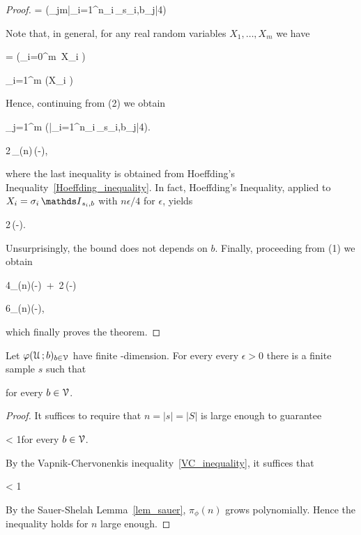 \documentclass[scombinatorics.tex]{subfiles}
\begin{document}
\begin{proof}
  {=}
  {\Pr\bigg(\max_{j\le m}\Big|\sum_{i=1}^n\sigma_i\,\Indicator_{s_i,b_j}\Big|\ge{}4\bigg)}

  Note that, in general, for any real random variables $X_1,\dots,X_m$ we have

  {=}
  {\Pr\Big(\bigcup_{i=0}^m\ X_i \ge \epsilon\Big)}

  \ceq{}
  {\le}
  {\sum_{i=1}^m \Pr\big(X_i \ge\epsilon\big)}

  Hence, continuing from (2) we obtain

  \ceq{}
  {\le}
  {\sum_{j=1}^m \Pr\bigg(\Big|\sum_{i=1}^n\sigma_i\,\Indicator_{s_i,b_j}\Big|\ge{}4\bigg).}

  \ceq{}
  {\le}
  {2\,\pi_\phi(n)\,\exp\bigg(-\bigg),}

  where the last inequality is obtained from Hoeffding's Inequality~\ref{Hoeffding_inequality}.
  In fact, Hoeffding's Inequality, applied to $X_i=\sigma_i\,\Indicator_{s_i,b}$ with $n\epsilon/4$ for $\epsilon$, yields

  {\le}
  {2\,\exp\Big(-\Big).}

  Unsurprisingly, the bound does not depends on $b$.
  Finally, proceeding from (1) we obtain

  \ceq{}
  {\le}
  {4\pi_\phi(n)\exp\Big(-\Big)\ +\ 2\,\exp\Big(-\Big)}

  \ceq{}
  {\le}
  {6\pi_\phi(n)\exp\Big(-\Big),}

  which finally proves the theorem.
\end{proof}

\begin{corollary}
  Let $\varphi(\EuScript U\,;b)_{b\in\EuScript V}$ have finite \vc-dimension. 
  For every every $\epsilon>0$ there is a finite sample $s$ such that

  \hfill for every $b\in\EuScript V$.
\end{corollary}
\begin{proof}
  It suffices to require that $n=|s|=|S|$ is large enough to guarantee 
  
  {<}
  {1}\hfill for every $b\in\EuScript V$.

  By the Vapnik-Chervonenkis inequality~\ref{VC_inequality}, it suffices that

  {<}
  {1}

  By the Sauer-Shelah Lemma~\ref{lem_sauer}, $\pi_\phi(n)$ grows polynomially.
  Hence the inequality holds for $n$ large enough.
\end{proof}
\end{document}
